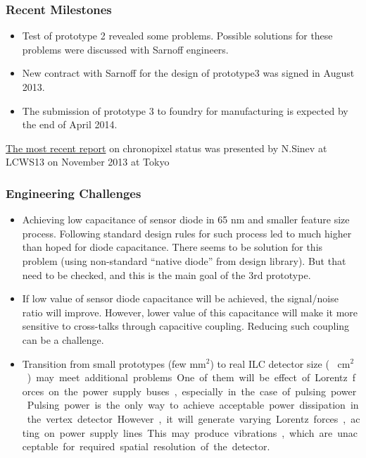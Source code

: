 \subsubsection{Recent Milestones}
\begin{itemize}
    \item Test of prototype 2 revealed some problems. Possible solutions for these problems were discussed with Sarnoff engineers.  
    \item New contract with Sarnoff for the design of prototype3 was signed in August 2013.
    \item The submission of prototype 3 to foundry for manufacturing is expected by the end of April 2014.
\end{itemize}
\href{https://agenda.linearcollider.org/getFile.py/access?contribId=309&sessionId=37&resId=1&materialId=slides&confId=6000}{The most recent report} on chronopixel status was presented by N.Sinev at LCWS13 on November 2013 at Tokyo 

\subsubsection{Engineering Challenges}
\begin{itemize}
    \item Achieving low capacitance of sensor diode in 65 nm and smaller feature size process. Following standard design rules for such process led to much higher than hoped for diode capacitance. There seems to be solution for this problem (using non-standard “native diode” from design library). But that need to be checked, and this is the main goal of the 3rd prototype. 
    \item If low value of sensor diode capacitance will be achieved, the signal/noise ratio will improve. However, lower value of this capacitance will make it more sensitive to cross-talks through capacitive coupling. Reducing such coupling can be a challenge.
    \item Transition from small prototypes (few $\text{mm}^{2}$) to real ILC detector size (~ \unit[10]{$\text{cm}^2$}) may meet additional problems. One of them will be effect of Lorentz forces on the power supply buses, especially in the case of pulsing power. Pulsing power is the only way to achieve acceptable power dissipation in the vertex detector. However, it will generate varying Lorentz forces, acting on power supply lines. This may produce vibrations, which are unacceptable for required spatial resolution of the detector.
\end{itemize}

